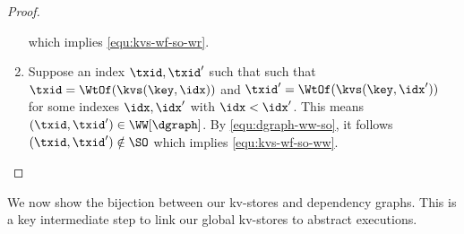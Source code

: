 \begin{toappendix}
\begin{proof}
\begin{enumerate}
    which implies \cref{equ:kvs-wf-so-wr}.
\item Suppose an index \( \txid, \txid' \) such that 
    such that \( \txid = \WtOf(\kvs(\key,\idx)) \) and \( \txid' = \WtOf(\kvs(\key,\idx')) \)
    for some indexes \( \idx, \idx' \) with \( \idx < \idx' \).
    This means \( (\txid,\txid') \in \WW[\dgraph] \).
    By \cref{equ:dgraph-ww-so}, it follows \( (\txid,\txid') \notin \SO\) 
    which implies \cref{equ:kvs-wf-so-ww}. \qedhere
\end{enumerate}
\end{proof}
\end{toappendix}

We now show the bijection between our kv-stores and dependency graphs.
This is a key intermediate step to link our global kv-stores to abstract executions.


